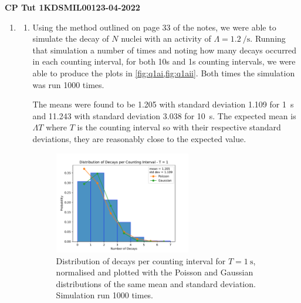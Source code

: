 \documentclass[11pt]{article}
\begin{document}
\begin{center}
    \textbf{CP Tut 1}\hspace{2in}\textbf{KDSMIL001}\hspace{2in}\textbf{23-04-2022}
\end{center}

\begin{enumerate}
    \item \begin{enumerate}
        \item Using the method outlined on page 33 of the notes, we were able to simulate the decay of $N$ nuclei with an activity of $\Lambda=\SI{1.2}{\per\second}$. Running that simulation a number of times and noting how many decays occurred in each counting interval, for both 10s and 1s counting intervals, we were able to produce the plots in \cref{fig:q1ai,fig:q1aii}. Both times the simulation was run 1000 times.
        
        The means were found to be 1.205 with standard deviation 1.109 for \SI{1}{\second} and 11.243 with standard deviation 3.038 for \SI{10}{\second}. The expected mean is $\Lambda T$ where $T$ is the counting interval so with their respective standard deviations, they are reasonably close to the expected value.
        
        \begin{figure}[h]
            \begin{center}
                \includegraphics[width=0.6\textwidth]{Plots/q1ai.pdf}
                \caption{Distribution of decays per counting interval for $T=\SI{1}{\second}$, normalised and plotted with the Poisson and Gaussian distributions of the same mean and standard deviation. Simulation run 1000 times.}
                \label{fig:q1ai}
            \end{center}
        \end{figure}
        

\end{enumerate}
\end{enumerate}
\end{document}
